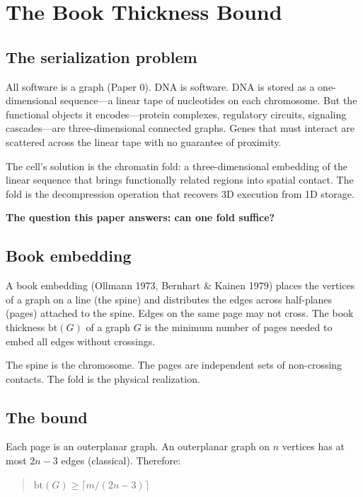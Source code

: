 \documentclass[11pt]{article}
\theoremstyle{definition}
\begin{document}
\section{The Book Thickness Bound}

\subsection{The serialization problem}

All software is a graph (Paper 0). DNA is software. DNA is stored as a one-dimensional sequence---a linear tape of nucleotides on each chromosome. But the functional objects it encodes---protein complexes, regulatory circuits, signaling cascades---are three-dimensional connected graphs. Genes that must interact are scattered across the linear tape with no guarantee of proximity.

The cell's solution is the chromatin fold: a three-dimensional embedding of the linear sequence that brings functionally related regions into spatial contact. The fold is the decompression operation that recovers 3D execution from 1D storage.

\textbf{The question this paper answers: can one fold suffice?}

\subsection{Book embedding}

A book embedding (Ollmann 1973, Bernhart \& Kainen 1979) places the vertices of a graph on a line (the spine) and distributes the edges across half-planes (pages) attached to the spine. Edges on the same page may not cross. The book thickness $\mathrm{bt}(G)$ of a graph $G$ is the minimum number of pages needed to embed all edges without crossings.

The spine is the chromosome. The pages are independent sets of non-crossing contacts. The fold is the physical realization.

\subsection{The bound}

Each page is an outerplanar graph. An outerplanar graph on $n$ vertices has at most $2n - 3$ edges (classical). Therefore:

\begin{quote}
$\mathrm{bt}(G) \geq \lceil m / (2n - 3) \rceil$
\end{quote}
\end{document}
